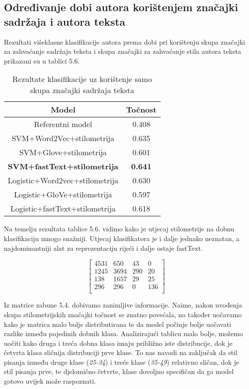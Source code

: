\documentclass[times, utf8, zavrsni]{fer}
\begin{document}
\subsection*{Određivanje dobi autora korištenjem značajki sadržaja i autora teksta}


Rezultati višeklasne klasifikacije autora prema dobi pri korištenju skupa značajki za zahvaćanje sadržaja teksta i skupa značajki za zahvaćanje stila autora teksta prikazani su u tablici 5.6.

\begin{table}[h!]
	\centering
	\begin{tabular}{||c|c||} 
		\hline
		Model & Točnost\\ [0.5ex] 
		\hline
		Referentni model & 0.408\\
		\hline
		SVM+Word2Vec+stilometrija & 0.635 \\
		\hline
		SVM+Glove+stilometrija & 0.601 \\
		\hline
		\textbf{SVM+fastText+stilometrija} & \textbf{0.641} \\
		\hline 
		Logistic+Word2vec+stilometrija & 0.630 \\ 
		\hline
		Logistic+GloVe+stilometrija & 0.597 \\ 
		\hline
		Logistic+fastText+stilometrija & 0.618 \\ 
		\hline
	\end{tabular}
	\caption{ Rezultate klasifikacije uz korištenje samo skupa značajki sadržaja teksta}
	\label{Table:1}
\end{table}

Na temelju rezultata tablice 5.6. vidimo kako je utjecaj stilometrije na dobnu klasifikaciju mnogo snažniji. Utjecaj klasifikatora je i dalje jednako neznatan, a najdominantniji alat za reprezentaciju riječi i dalje ostaje fastText.

\begin{equation}
\begin{bmatrix}
4531 & 650 & 43 & 0 \\
1245 & 3694 & 290 & 20 \\
138 & 1657 & 29 & 25\\
296 & 296 & 0 & 136\\
\end{bmatrix}
\end{equation}\newline

Iz matrice zabune 5.4. dobivamo zanimljive informacije. Naime, nakon uvođenja skupa stilometrijskih značajki točnost se znatno povećala, no također uočavamo kako je matrica malo bolje distributirana te da model počinje bolje uočavati razlike između pojedinih dobnih klasa. Analizirajući tablicu malo bolje, možemo uočiti kako druga i treća dobna klasa imaju približno iste distribucije, dok je četvrta klasa sličnija distribuciji prve klase. To nas navodi na zaključak da stil pisanja između druge klase (\textit{25-34}) i treće klase (\textit{35-49}) relativno sličan, dok je stil pisanja prve, te djelomično četvrte, klase dovoljno specifičan da ga model gotovo uvijek može raspoznati.
\end{document}

